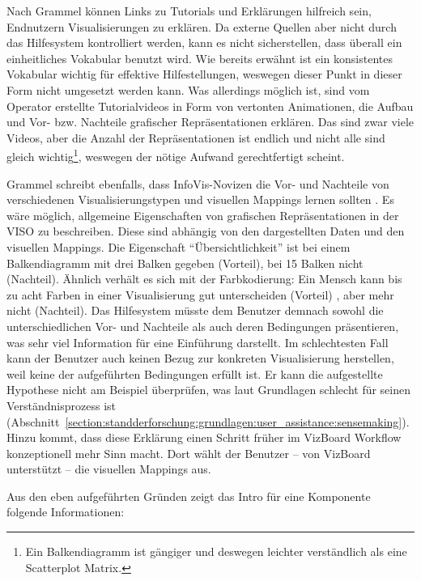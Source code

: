 \documentclass[
	headsepline,
	footsepline,
	fontsize=12pt,
	bibliography=totoc
]{scrbook}
\begin{document}

Nach Grammel \cite{Grammel2012} können Links zu Tutorials und Erklärungen hilfreich sein, Endnutzern Visualisierungen zu erklären. Da externe Quellen aber nicht durch das Hilfesystem kontrolliert werden, kann es nicht sicherstellen, dass überall ein einheitliches Vokabular benutzt wird. Wie bereits erwähnt ist ein konsistentes Vokabular wichtig für effektive Hilfestellungen, weswegen dieser Punkt in dieser Form nicht umgesetzt werden kann. Was allerdings möglich ist, sind vom Operator erstellte Tutorialvideos in Form von vertonten Animationen, die Aufbau und Vor- bzw. Nachteile grafischer Repräsentationen erklären. Das sind zwar viele Videos, aber die Anzahl der Repräsentationen ist endlich und nicht alle sind gleich wichtig\footnote{Ein Balkendiagramm ist gängiger und deswegen leichter verständlich als eine Scatterplot Matrix.}, weswegen der nötige Aufwand gerechtfertigt scheint.

Grammel schreibt ebenfalls, dass InfoVis-Novizen die Vor- und Nachteile von verschiedenen Visualisierungstypen und visuellen Mappings lernen sollten \cite[S. 125]{Grammel2012}. Es wäre möglich, allgemeine Eigenschaften von grafischen Repräsentationen in der VISO zu beschreiben. Diese sind abhängig von den dargestellten Daten und den visuellen Mappings. Die Eigenschaft \enquote{Übersichtlichkeit} ist bei einem Balkendiagramm mit drei Balken gegeben (Vorteil), bei 15 Balken nicht (Nachteil). Ähnlich verhält es sich mit der Farbkodierung: Ein Mensch kann bis zu acht Farben in einer Visualisierung gut unterscheiden (Vorteil) \cite{Mazza2009}, aber mehr nicht (Nachteil). Das Hilfesystem müsste dem Benutzer demnach sowohl die unterschiedlichen Vor- und Nachteile als auch deren Bedingungen präsentieren, was sehr viel Information für eine Einführung darstellt. Im schlechtesten Fall kann der Benutzer auch keinen Bezug zur konkreten Visualisierung herstellen, weil keine der aufgeführten Bedingungen erfüllt ist. Er kann die aufgestellte Hypothese nicht am Beispiel überprüfen, was laut Grundlagen schlecht für seinen Verständnisprozess ist (Abschnitt~\ref{section:standderforschung:grundlagen:user_assistance:sensemaking}). Hinzu kommt, dass diese Erklärung einen Schritt früher im VizBoard Workflow konzeptionell mehr Sinn macht. Dort wählt der Benutzer -- von VizBoard unterstützt -- die visuellen Mappings aus.

Aus den eben aufgeführten Gründen zeigt das Intro für eine Komponente folgende Informationen:
\end{document}
